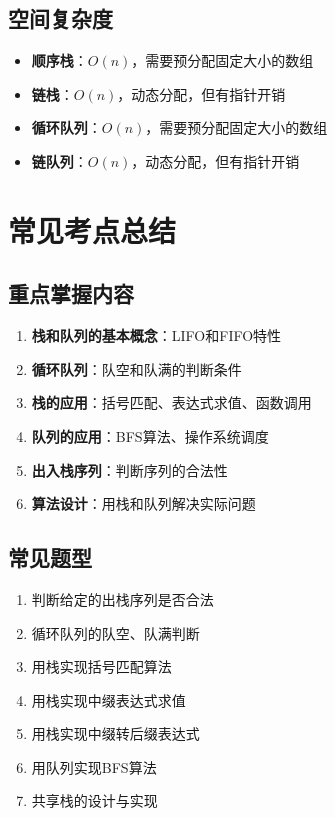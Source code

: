 \documentclass[12pt,a4paper]{amsart}
\begin{document}
\subsection{空间复杂度}

\begin{itemize}
\item \textbf{顺序栈}：$O(n)$，需要预分配固定大小的数组
\item \textbf{链栈}：$O(n)$，动态分配，但有指针开销
\item \textbf{循环队列}：$O(n)$，需要预分配固定大小的数组
\item \textbf{链队列}：$O(n)$，动态分配，但有指针开销
\end{itemize}

\section{常见考点总结}

\subsection{重点掌握内容}

\begin{enumerate}
\item \textbf{栈和队列的基本概念}：LIFO和FIFO特性
\item \textbf{循环队列}：队空和队满的判断条件
\item \textbf{栈的应用}：括号匹配、表达式求值、函数调用
\item \textbf{队列的应用}：BFS算法、操作系统调度
\item \textbf{出入栈序列}：判断序列的合法性
\item \textbf{算法设计}：用栈和队列解决实际问题
\end{enumerate}

\subsection{常见题型}

\begin{enumerate}
\item 判断给定的出栈序列是否合法
\item 循环队列的队空、队满判断
\item 用栈实现括号匹配算法
\item 用栈实现中缀表达式求值
\item 用栈实现中缀转后缀表达式
\item 用队列实现BFS算法
\item 共享栈的设计与实现
\end{enumerate}
\end{document}
